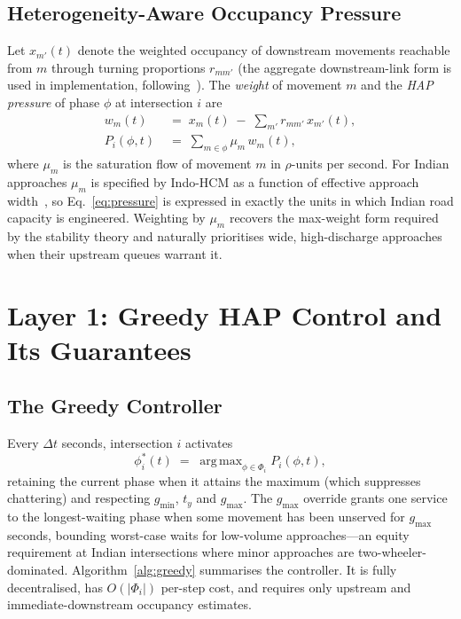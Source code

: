 \documentclass[journal]{IEEEtran}
\DeclareMathOperator*{\argmax}{arg\,max}
\begin{document}
\subsection{Heterogeneity-Aware Occupancy Pressure}
\label{subsec:hap}
Let $x_{m'}(t)$ denote the weighted occupancy of downstream movements
reachable from $m$ through turning proportions $r_{mm'}$ (the aggregate
downstream-link form is used in implementation,
following~\cite{b_efficientmp}). The \emph{weight} of movement $m$ and
the \emph{HAP pressure} of phase $\phi$ at intersection $i$ are
\begin{align}
w_m(t) &\;=\; x_m(t) \;-\; \sum_{m'} r_{m m'}\, x_{m'}(t),
\label{eq:weight}\\
P_i(\phi, t) &\;=\; \sum_{m \in \phi} \mu_m\, w_m(t),
\label{eq:pressure}
\end{align}
where $\mu_m$ is the saturation flow of movement $m$ in $\rho$-units per
second. For Indian approaches $\mu_m$ is specified by Indo-HCM as a
function of effective approach width~\cite{b_indohcm,b_radha}, so
Eq.~\eqref{eq:pressure} is expressed in exactly the units in which Indian
road capacity is engineered. Weighting by $\mu_m$ recovers the max-weight
form required by the stability theory and naturally prioritises wide,
high-discharge approaches when their upstream queues warrant it.

\section{Layer 1: Greedy HAP Control and Its Guarantees}
\label{sec:theory}

\subsection{The Greedy Controller}
Every $\Delta t$ seconds, intersection $i$ activates
\begin{equation}
\phi^*_i(t) \;=\; \argmax_{\phi \in \Phi_i} P_i(\phi, t),
\label{eq:greedy}
\end{equation}
retaining the current phase when it attains the maximum (which suppresses
chattering) and respecting $g_{\min}$, $t_y$ and $g_{\max}$. The
$g_{\max}$ override grants one service to the longest-waiting phase when
some movement has been unserved for $g_{\max}$ seconds, bounding
worst-case waits for low-volume approaches---an equity requirement at
Indian intersections where minor approaches are two-wheeler-dominated.
Algorithm~\ref{alg:greedy} summarises the controller. It is fully
decentralised, has $O(|\Phi_i|)$ per-step cost, and requires only
upstream and immediate-downstream occupancy estimates.
\end{document}
